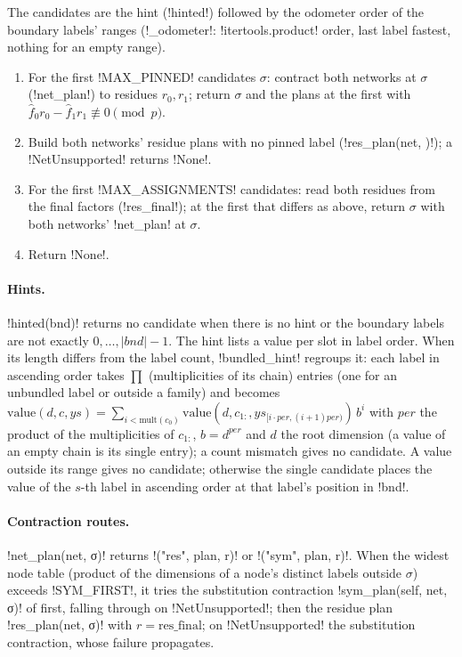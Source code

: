 {{{\begin{algorithm}\label{alg:lean-export-refute-sigma}
The candidates are the hint (\lexpy!hinted!) followed by the odometer order of the boundary labels'
ranges (\lexpy!_odometer!: \lexpy!itertools.product! order, last label fastest, nothing for an empty
range).
\begin{enumerate}
\item For the first \lexpy!MAX_PINNED! candidates $\sigma$: contract both networks at $\sigma$
(\lexpy!net_plan!) to residues $r_0, r_1$; return $\sigma$ and the plans at the first with
$\hat f_0 r_0 - \hat f_1 r_1 \not\equiv 0 \pmod p$.
\item Build both networks' residue plans with no pinned label (\lexpy!res_plan(net, {})!); a
\lexpy!NetUnsupported! returns \lexpy!None!.
\item For the first \lexpy!MAX_ASSIGNMENTS! candidates: read both residues from the final factors
(\lexpy!res_final!); at the first that differs as above, return $\sigma$ with both networks'
\lexpy!net_plan! at $\sigma$.
\item Return \lexpy!None!.
\end{enumerate}
\end{algorithm}

\paragraph{Hints.} \lexpy!hinted(bnd)! returns no candidate when there is no hint or the boundary
labels are not exactly $0, \ldots, |\mathit{bnd}|-1$. The hint lists a value per slot in label
order. When its length differs from the label count, \lexpy!bundled_hint! regroups it: each label
in ascending order takes $\prod$ (multiplicities of its chain) entries (one for an unbundled
label or outside a family) and becomes
$\mathrm{value}(d, c, ys) = \sum_{i < \mathrm{mult}(c_0)} \mathrm{value}(d, c_{1:},
ys_{[i\cdot\mathit{per},(i+1)\mathit{per})})\,b^i$ with $\mathit{per}$ the product of the
multiplicities of $c_{1:}$, $b = d^{\mathit{per}}$ and $d$ the root dimension (a value of an
empty chain is its single entry); a count mismatch gives no candidate. A value outside its range
gives no candidate; otherwise the single candidate places the value of the $s$-th label in
ascending order at that label's position in \lexcode!bnd!.

\paragraph{Contraction routes.} \lexpy!net_plan(net, σ)! returns \lexcode!("res", plan, r)! or
\lexcode!("sym", plan, r)!. When the widest node table (product of the dimensions of a node's
distinct labels outside $\sigma$) exceeds \lexpy!SYM_FIRST!, it tries the substitution contraction
\lexpy!sym_plan(self, net, σ)! of  first, falling through
on \lexpy!NetUnsupported!; then the residue plan \lexpy!res_plan(net, σ)! with
$r = \mathrm{res\_final}$; on \lexpy!NetUnsupported! the substitution contraction, whose failure
propagates.

}}}
